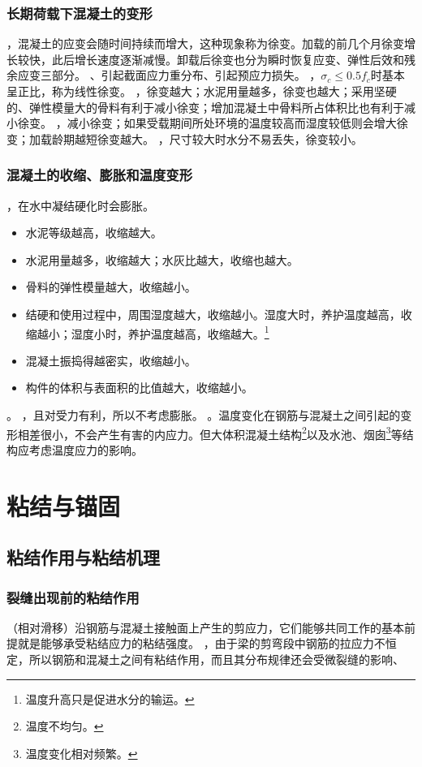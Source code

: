\documentclass{article}
\begin{document}
\subsubsection{长期荷载下混凝土的变形}
，混凝土的应变会随时间持续而增大，这种现象称为徐变。加载的前几个月徐变增长较快，此后增长速度逐渐减慢。卸载后徐变也分为瞬时恢复应变、弹性后效和残余应变三部分。
、引起截面应力重分布、引起预应力损失。
，$\sigma_c\leq0.5f_c$时基本呈正比，称为线性徐变。
，徐变越大；水泥用量越多，徐变也越大；采用坚硬的、弹性模量大的骨料有利于减小徐变；增加混凝土中骨料所占体积比也有利于减小徐变。
，减小徐变；如果受载期间所处环境的温度较高而湿度较低则会增大徐变；加载龄期越短徐变越大。
，尺寸较大时水分不易丢失，徐变较小。
\subsubsection{混凝土的收缩、膨胀和温度变形}
，在水中凝结硬化时会膨胀。
\begin{itemize}
    \item 水泥等级越高，收缩越大。
    \item 水泥用量越多，收缩越大；水灰比越大，收缩也越大。
    \item 骨料的弹性模量越大，收缩越小。
    \item 结硬和使用过程中，周围湿度越大，收缩越小。湿度大时，养护温度越高，收缩越小；湿度小时，养护温度越高，收缩越大。\footnote{温度升高只是促进水分的输运。}
    \item 混凝土振捣得越密实，收缩越小。
    \item 构件的体积与表面积的比值越大，收缩越小。
\end{itemize}
。
，且对受力有利，所以不考虑膨胀。
。温度变化在钢筋与混凝土之间引起的变形相差很小，不会产生有害的内应力。但大体积混凝土结构\footnote{温度不均匀。}以及水池、烟囱\footnote{温度变化相对频繁。}等结构应考虑温度应力的影响。
\section{粘结与锚固}
\subsection{粘结作用与粘结机理}
\subsubsection{裂缝出现前的粘结作用}
（相对滑移）沿钢筋与混凝土接触面上产生的剪应力，它们能够共同工作的基本前提就是能够承受粘结应力的粘结强度。
，由于梁的剪弯段中钢筋的拉应力不恒定，所以钢筋和混凝土之间有粘结作用，而且其分布规律还会受微裂缝的影响、
\end{document}
